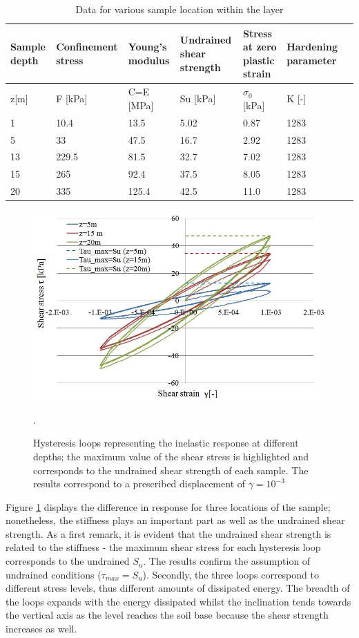 \documentclass[12pt,a4paper]{report}
\begin{document}
\begin{table}[h!]
	\centering
	\begin{tabular}{|p{2cm}|p{2cm}|p{2cm}| p{3cm}|p{2cm}|p{2cm}|p{2cm}|}
		\hline Sample depth &Confinement stress & Young's modulus  & Undrained shear strength &  Stress at zero plastic strain & Hardening parameter\\
		\hline  z[m]  & F [kPa]  & C=E [MPa] & Su [kPa] & $\sigma_0$ [kPa]  & K [-] \\
		\hline 1    & 10.4 & 13.5 & 5.02 & 0.87 &  1283 \\ 
		\hline 5  & 33  &  47.5 & 16.7 & 2.92  & 1283\\ 
		\hline 13  &  229.5  &  81.5  & 32.7 & 7.02  &  1283\\ 
		\hline 15 &  265  &  92.4  & 37.5 & 8.05  & 1283\\ 
		\hline 20 &  335  &    125.4  & 42.5 &  11.0  & 1283 \\ 
		\hline
	\end{tabular}
	\caption{Data for various sample location within the layer}
	\label{Table2}
\end{table}

\begin{figure}[h!]
	\centering
	\includegraphics[width=0.8\linewidth]{"oneElem1"}
	\caption{Hysteresis loops representing the inelastic response at different depths; the maximum value of the shear stress is highlighted and corresponds to the undrained shear strength of each sample. The results correspond to a prescribed displacement of $\gamma=10^{-3}$}
	\label{loops2}.
\end{figure}

Figure \ref{loops2} displays the difference in response for three locations of the sample; nonetheless, the stiffness plays an important part as well as the undrained shear strength. As a first remark, it is evident that the undrained shear strength is related to the stiffness - the maximum shear stress for each hysteresis loop corresponds to the undrained $S_u$. The results confirm the assumption of undrained conditions ($\tau_{max}=S_u$). Secondly, the three loops correspond to different stress levels, thus different amounts of dissipated energy. The breadth of the loops expands with the energy dissipated whilst the inclination tends towards the vertical axis as the level reaches the soil base because the shear strength increases as well. 
\end{document}
